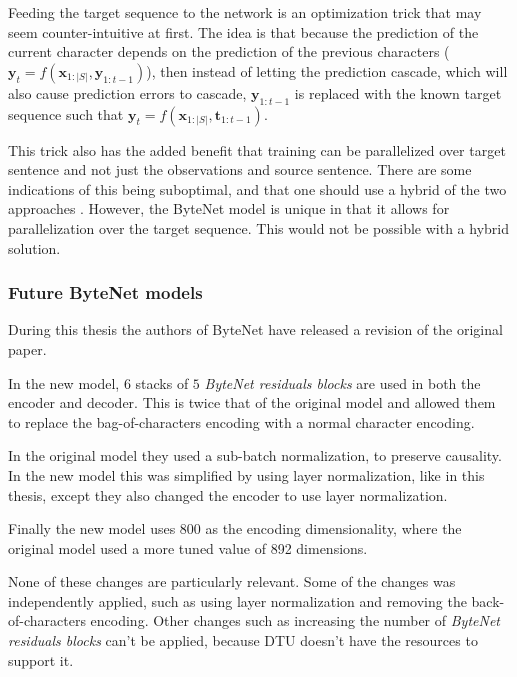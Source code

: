 Feeding the target sequence to the network is an optimization trick that may seem counter-intuitive at first. The idea is that because the prediction of the current character depends on the prediction of the previous characters ($\mathbf{y}_t = f(\mathbf{x}_{1:|S|}, \mathbf{y}_{1:t-1})$), then instead of letting the prediction cascade, which will also cause prediction errors to cascade, $\mathbf{y}_{1:t-1}$ is replaced with the known target sequence such that $\mathbf{y}_t = f(\mathbf{x}_{1:|S|}, \mathbf{t}_{1:t-1})$.

This trick also has the added benefit that training can be parallelized over target sentence and not just the observations and source sentence. There are some indications of this being suboptimal, and that one should use a hybrid of the two approaches \cite{no-assist-train}. However, the ByteNet model is unique in that it allows for parallelization over the target sequence. This would not be possible with a hybrid solution.

\subsubsection{Future ByteNet models}
During this thesis the authors of ByteNet have released a revision of the original paper.

In the new model, $6$ stacks of $5$ \textit{ByteNet residuals blocks} are used in both the encoder and decoder. This is twice that of the original model and allowed them to replace the bag-of-characters encoding with a normal character encoding.

In the original model they used a sub-batch normalization, to preserve causality. In the new model this was simplified by using layer normalization, like in this thesis, except they also changed the encoder to use layer normalization.

Finally the new model uses 800 as the encoding dimensionality, where the original model used a more tuned value of 892 dimensions.

None of these changes are particularly relevant. Some of the changes was independently applied, such as using layer normalization and removing the back-of-characters encoding. Other changes such as increasing the number of \textit{ByteNet residuals blocks} can't be applied, because DTU doesn't have the resources to support it.